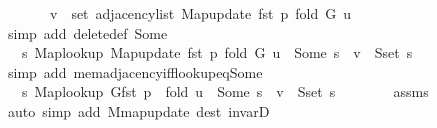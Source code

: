 \begin{isabellebody}
\ \ \ \ \ \ \ v\ {\isasymin}\ set\ {\isacharparenleft}{\kern0pt}adjacency{\isacharunderscore}{\kern0pt}list\ {\isacharparenleft}{\kern0pt}Map{\isacharunderscore}{\kern0pt}update\ {\isacharparenleft}{\kern0pt}fst\ p{\isacharparenright}{\kern0pt}\ {\isacharquery}{\kern0pt}fold\ G{\isacharparenright}{\kern0pt}\ u{\isacharparenright}{\kern0pt}{\isachardoublequoteclose}\isanewline
\ \ \ \ \ \ \isamarkupfalse%
\ {\isacharparenleft}{\kern0pt}simp\ add{\isacharcolon}{\kern0pt}\ delete{\isacharunderscore}{\kern0pt}{}{\isacharunderscore}{\kern0pt}def\ Some{\isacharparenright}{\kern0pt}\isanewline
\ \ \ \ \isamarkupfalse%
\ \isamarkupfalse%
\ {\isachardoublequoteopen}{\isachardot}{\kern0pt}{\isachardot}{\kern0pt}{\isachardot}{\kern0pt}\ {\isasymlongleftrightarrow}\ {\isacharparenleft}{\kern0pt}{\isasymexists}s{\isachardot}{\kern0pt}\ Map{\isacharunderscore}{\kern0pt}lookup\ {\isacharparenleft}{\kern0pt}Map{\isacharunderscore}{\kern0pt}update\ {\isacharparenleft}{\kern0pt}fst\ p{\isacharparenright}{\kern0pt}\ {\isacharquery}{\kern0pt}fold\ G{\isacharparenright}{\kern0pt}\ u\ {\isacharequal}{\kern0pt}\ Some\ s\ {\isasymand}\ v\ {\isasymin}\ S{\isachardot}{\kern0pt}set\ s{\isacharparenright}{\kern0pt}{\isachardoublequoteclose}\isanewline
\ \ \ \ \ \ \isamarkupfalse%
\ {\isacharparenleft}{\kern0pt}simp\ add{\isacharcolon}{\kern0pt}\ mem{\isacharunderscore}{\kern0pt}adjacency{\isacharunderscore}{\kern0pt}iff{\isacharunderscore}{\kern0pt}lookup{\isacharunderscore}{\kern0pt}eq{\isacharunderscore}{\kern0pt}Some{\isacharparenright}{\kern0pt}\isanewline
\ \ \ \ \isamarkupfalse%
\ \isamarkupfalse%
\ {\isachardoublequoteopen}{\isachardot}{\kern0pt}{\isachardot}{\kern0pt}{\isachardot}{\kern0pt}\ {\isasymlongleftrightarrow}\ {\isacharparenleft}{\kern0pt}{\isasymexists}s{\isachardot}{\kern0pt}\ {\isacharparenleft}{\kern0pt}Map{\isacharunderscore}{\kern0pt}lookup\ G{\isacharparenleft}{\kern0pt}fst\ p\ {\isasymmapsto}\ {\isacharquery}{\kern0pt}fold{\isacharparenright}{\kern0pt}{\isacharparenright}{\kern0pt}\ u\ {\isacharequal}{\kern0pt}\ Some\ s\ {\isasymand}\ v\ {\isasymin}\ S{\isachardot}{\kern0pt}set\ s{\isacharparenright}{\kern0pt}{\isachardoublequoteclose}\isanewline
\ \ \ \ \ \ \isamarkupfalse%
\ assms\isanewline
\ \ \ \ \ \ \isamarkupfalse%
\ {\isacharparenleft}{\kern0pt}auto\ simp\ add{\isacharcolon}{\kern0pt}\ M{\isachardot}{\kern0pt}map{\isacharunderscore}{\kern0pt}update\ dest{\isacharcolon}{\kern0pt}\ invarD{\isacharparenleft}{\kern0pt}{}{\isacharparenright}{\kern0pt}{\isacharparenright}{\kern0pt}\isanewline

\end{isabellebody}
